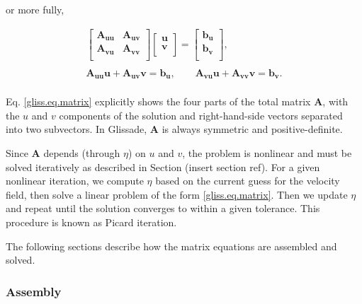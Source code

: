 \noindent
or more fully,

\begin{equation}
  \label{gliss.eq.matrix}
  \begin{matrix}
    \left[ \begin{matrix}
        \mathbf{A}_{\mathbf{uu}} & \mathbf{A}_{\mathbf{uv}}  \\
        \mathbf{A}_{\mathbf{vu}} & \mathbf{A}_{\mathbf{vv}}  \\
      \end{matrix} \right]\left[ \begin{matrix}
        \mathbf{u}  \\
        \mathbf{v}  \\
      \end{matrix} \right]=\left[ \begin{matrix}
        \mathbf{b}_{\mathbf{u}}  \\
        \mathbf{b}_{\mathbf{v}}  \\
      \end{matrix} \right], \\ 
    \\ 
    \mathbf{A}_{\mathbf{uu}}\mathbf{u} + \mathbf{A}_{\mathbf{uv}}\mathbf{v} =\mathbf{b}_{\mathbf{u}},
    \quad \quad \mathbf{A}_{\mathbf{vu}}\mathbf{u} + \mathbf{A}_{\mathbf{vv}}\mathbf{v} =\mathbf{b}_{\mathbf{v}}. \\ 
  \end{matrix}
\end{equation}

\noindent
Eq. \eqref{gliss.eq.matrix} explicitly shows the four parts of the total matrix $\mathbf{A}$,
with the $u$ and $v$ components of the solution and right-hand-side vectors separated into two subvectors.
In Glissade, $\mathbf{A}$ is always symmetric and positive-definite.

Since $\mathbf{A}$ depends (through $\eta$) on $u$ and $v$, the problem is nonlinear and must be solved iteratively
as described in Section (insert section ref).  For a given nonlinear iteration, we compute $\eta$ based on the
current guess for the velocity field, then solve a linear problem of the form \eqref{gliss.eq.matrix}.
Then we update $\eta$ and repeat until the solution converges to within a given tolerance.  This procedure
is known as Picard iteration.

The following sections describe how the matrix equations are assembled and solved. 

\subsubsection{Assembly}


